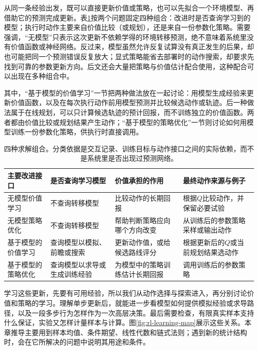 从同一条经验出发，既可以直接更新价值或策略，也可以先拟合一个环境模型、再借助它的预测完成更新。表\ref{tab:rl-learning-four-interfaces}按两个问题固定四种组合：改进时是否查询学习到的模型；执行时动作主要来自价值比较（或规划），还是来自一份参数化策略。需要强调，“无模型”只表示这次更新不依赖学得的环境转移预测，绝不意味着系统里没有价值函数或神经网络。反过来，模型虽然允许反复试算没有真正发生的后果，却也可能把同一个预测错误反复放大；显式策略能省去部署时的动作搜索，却要求先找到可靠的参数更新方向。后文还会大量把策略与价值估计配合使用，这种配合可以出现在多种组合中。

其中，“基于模型的价值学习”一节把两种做法放在一起讨论：用模型生成经验来更新价值函数，以及在每次执行动作前用模型预测并比较候选动作或轨迹。后一种做法属于在线规划，可以只计算候选轨迹的预计回报，而不训练独立的价值函数。两者都由价值比较或规划结果产生动作；“基于模型的策略优化”一节则讨论如何用模型训练一份参数化策略，供执行时直接调用。

\begin{table}[t]
  \centering
  \small
  \begin{tabularx}{\linewidth}{>{\raggedright\arraybackslash}p{26mm} >{\raggedright\arraybackslash}X >{\raggedright\arraybackslash}X >{\raggedright\arraybackslash}X}
    \toprule
    主要改进接口 & 是否查询学习模型 & 价值承担的作用 & 最终动作来源与例子 \\
    \midrule
    无模型价值学习 & 不查询转移模型 & 比较动作的长期回报 & 根据$Q$比较动作，并保留必要试验 \\
    无模型策略优化 & 不查询转移模型 & 帮助判断策略应向哪个方向改变 & 从训练后的参数策略采样或输出动作 \\
    基于模型的价值学习 & 查询模型以模拟、前瞻或搜索 & 更新动作值，或给候选路线评分 & 根据更新后的$Q$或当前规划结果选动作 \\
    基于模型的策略优化 & 查询模型以求导或生成训练经验 & 为模型中的策略训练估计长期回报 & 调用训练后的参数策略 \\
    \bottomrule
  \end{tabularx}
  \caption{四种求解组合。分类依据是交互记录、训练目标与动作接口之间的实际依赖，而不是系统里是否出现过预测网络。}
  \label{tab:rl-learning-four-interfaces}
\end{table}

学习这些更新，先要有可用经验，所以我们从动作选择与探索进入，再分别讨论价值和策略的学习。理解单步更新后，就能进一步看模型如何提供模拟经验或求导路径，以及一段多步行为怎样作为一次高层决策。最后需要检查，有限真实样本支持什么保证，实验又怎样计量样本与计算。图\ref{fig:rl-learning-map}展示这些关系。本章推导主要用到样本均值、条件期望、线性代数和链式法则；遇到新的统计结构时，会在它所解决的问题中说明其用途和条件。

